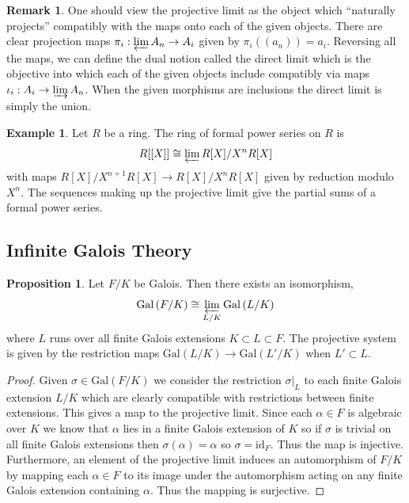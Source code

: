 \documentclass{article}
\newcommand{\Gal}[1]{\mathrm{Gal}\left( #1 \right)}
\newcommand{\id}{\mathrm{id}}
\theoremstyle{definition}
\newtheorem{proposition}[theorem]{Proposition}
\newtheorem{example}[theorem]{Example}
\newtheorem{remark}{Remark}[section]
\begin{document}
\begin{remark}
One should view the projective limit as the object which ``naturally projects'' compatibly with the maps onto each of the given objects. There are clear projection maps $\pi_i : \varprojlim A_n \to A_i$ given by $\pi_i((a_n)) = a_i$. Reversing all the maps, we can define the dual notion called the direct limit which is the objective into which each of the given objects include compatibly via maps $\iota_i : A_i \to \varinjlim A_n$. When the given morphisms are inclusions the direct limit is simply the union. 
\end{remark}

\begin{example}
Let $R$ be a ring. The ring of formal power series on $R$ is
\[ R[[X]] \cong \varprojlim R[X] / X^n R[X] \]
with maps $R[X] / X^{n+1} R[X] \to R[X] / X^n R[X]$ given by reduction modulo $X^n$. The sequences making up the projective limit give the partial sums of a formal power series.
\end{example}

\subsection{Infinite Galois Theory}

\begin{proposition}
Let $F / K$ be Galois. Then there exists an isomorphism,
\[ \Gal{F / K} \cong \varprojlim_{L/K} \Gal{L / K} \] 
where $L$ runs over all finite Galois extensions $K \subset L \subset F$. The projective system is given by the restriction maps $\Gal{L / K} \to \Gal{L' / K}$ when $L' \subset L$. 
\end{proposition}

\begin{proof}
Given $\sigma \in \Gal{F / K}$ we consider the restriction $\sigma |_L$ to each finite Galois extension $L / K$ which are clearly compatible with restrictions between finite extensions. This gives a map to the projective limit. Since each $\alpha \in F$ is algebraic over $K$ we know that $\alpha$ lies in a finite Galois extension of $K$ so if $\sigma$ is trivial on all finite Galois extensions then $\sigma(\alpha) = \alpha$ so $\sigma = \id_F$. Thus the map is injective. Furthermore, an element of the projective limit induces an automorphism of $F / K$ by mapping each $\alpha \in F$ to its image under the automorphism acting on any finite Galois extension containing $\alpha$. Thus the mapping is surjective. 
\end{proof}
\end{document}
